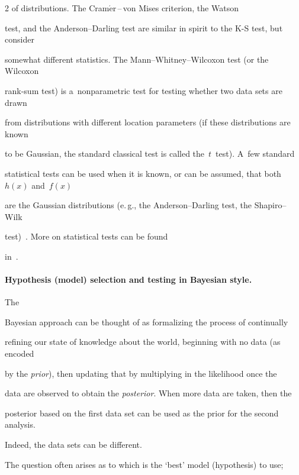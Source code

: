 \begin{multicols}{2}
of distributions. The Cram$\acute{\mbox{e}}$r\,--\,von Mises criterion, the Watson


test, and the Anderson--Darling test are similar in spirit to the K-S test, but consider


somewhat different statistics. The Mann--Whitney--Wilcoxon test (or the Wilcoxon


rank-sum test) is a~nonparametric test for testing whether two data sets are drawn


from distributions with different location parameters (if these distributions are known


to be Gaussian, the standard classical test is called the~$t$~test). A~few standard


statistical tests can be used when it is known, or can be assumed, that both~$h(x)$ and~$f(x)$


are the Gaussian distributions (e.\,g., the Anderson--Darling test, the Shapiro--Wilk


test)~\cite{27-kl}. More on statistical tests can be found


in~\cite{27-kl, 29-kl, 30-kl, 31-kl}.





\vspace*{-6pt}





  \paragraph*{Hypothesis (model) selection and testing in Bayesian style.} The


Bayesian approach can be thought of as formalizing the process of continually


refining our state of knowledge about the world, beginning with no data (as encoded


by the \textit{prior}), then updating that by multiplying in the likelihood once the


data  are observed to obtain the \textit{posterior}. When more data are taken, then the


posterior based on the first data set can be used as the prior for the second analysis.


Indeed, the data sets can be different.





  The question often arises as to which is the `best' model (hypothesis) to use;



\end{multicols}
